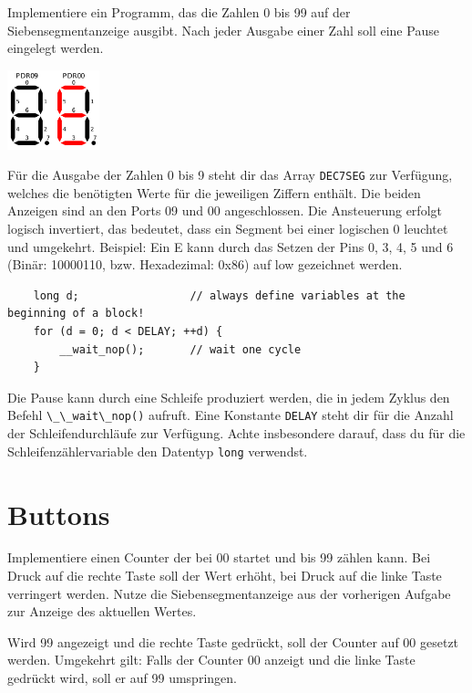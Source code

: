 Implementiere ein Programm, das die Zahlen 0 bis 99 auf der Siebensegmentanzeige ausgibt.
Nach jeder Ausgabe einer Zahl soll eine Pause eingelegt werden.

\begin{center}
	\includegraphics[width=0.2\textwidth]{figures/7seg_e}
\end{center}

Für die Ausgabe der Zahlen 0 bis 9 steht dir das Array \lstinline{DEC7SEG} zur Verfügung, welches die benötigten Werte für die jeweiligen Ziffern enthält.
Die beiden Anzeigen sind an den Ports 09 und 00 angeschlossen.
Die Ansteuerung erfolgt logisch invertiert, das bedeutet, dass ein Segment bei einer logischen 0 leuchtet und umgekehrt.
Beispiel: Ein \glqq{}E\grqq{} kann durch das Setzen der Pins 0, 3, 4, 5 und 6 (Binär: 10000110, bzw. Hexadezimal: 0x86) auf low gezeichnet werden.

\begin{lstlisting}
	long d;					// always define variables at the beginning of a block!
	for (d = 0; d < DELAY; ++d) {
		__wait_nop();		// wait one cycle
	}
\end{lstlisting}

Die Pause kann durch eine Schleife produziert werden, die in jedem Zyklus den Befehl \lstinline{\_\_wait\_nop()} aufruft.
Eine Konstante \lstinline{DELAY} steht dir für die Anzahl der Schleifendurchläufe zur Verfügung.
Achte insbesondere darauf, dass du für die Schleifenzählervariable den Datentyp \lstinline{long} verwendst.



\section{Buttons}
Implementiere einen Counter der bei 00 startet und bis 99 zählen kann.
Bei Druck auf die rechte Taste soll der Wert erhöht, bei Druck auf die linke Taste verringert werden.
Nutze die Siebensegmentanzeige aus der vorherigen Aufgabe zur Anzeige des aktuellen Wertes.

Wird 99 angezeigt und die rechte Taste gedrückt, soll der Counter auf 00 gesetzt werden.
Umgekehrt gilt: Falls der Counter 00 anzeigt und die linke Taste gedrückt wird, soll er auf 99 umspringen.

